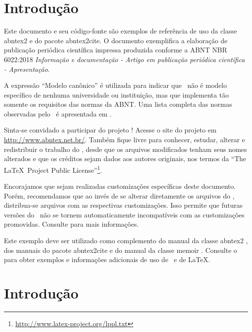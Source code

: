 \documentclass[
	article,			%
	11pt,				%
	oneside,			%
	a4paper,			%
	twocolumn,
	english,			%
	brazil,				%
	sumario=tradicional
	]{abntex2}
\begin{document}
\textual

\chapter{Introdução}

Este documento e seu código-fonte são exemplos de referência de uso da classe
\textsf{abntex2} e do pacote \textsf{abntex2cite}. O documento exemplifica a
elaboração de publicação periódica científica impressa produzida conforme a ABNT
NBR 6022:2018 \emph{Informação e documentação - Artigo em publicação periódica
científica - Apresentação}.

A expressão ``Modelo canônico'' é utilizada para indicar que \abnTeX\ não é
modelo específico de nenhuma universidade ou instituição, mas que implementa tão
somente os requisitos das normas da ABNT. Uma lista completa das normas
observadas pelo \abnTeX\ é apresentada em .

Sinta-se convidado a participar do projeto \abnTeX! Acesse o site do projeto em
\url{http://www.abntex.net.br/}. Também fique livre para conhecer,
estudar, alterar e redistribuir o trabalho do \abnTeX, desde que os arquivos
modificados tenham seus nomes alterados e que os créditos sejam dados aos
autores originais, nos termos da ``The \LaTeX\ Project Public
License''\footnote{\url{http://www.latex-project.org/lppl.txt}}.

Encorajamos que sejam realizadas customizações específicas deste documento.
Porém, recomendamos que ao invés de se alterar diretamente os arquivos do
\abnTeX, distribua-se arquivos com as respectivas customizações. Isso permite
que futuras versões do \abnTeX~não se tornem automaticamente incompatíveis com
as customizações promovidas. Consulte 
para mais informações.

Este exemplo deve ser utilizado como complemento do manual da classe
\textsf{abntex2} \cite{abntex2classe}, dos manuais do pacote
\textsf{abntex2cite} \cite{abntex2cite,abntex2cite-alf} e do manual da classe
\textsf{memoir} \cite{memoir}. Consulte o  para obter
exemplos e informações adicionais de uso de \abnTeX\ e de \LaTeX.


\chapter{Introdução}
\end{document}
